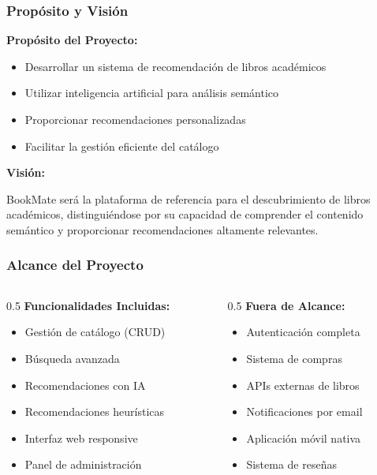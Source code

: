 \documentclass[aspectratio=169]{beamer}
\begin{document}
\begin{frame}
\frametitle{Propósito y Visión}

\textbf{Propósito del Proyecto:}
\begin{itemize}
\item Desarrollar un sistema de recomendación de libros académicos
\item Utilizar inteligencia artificial para análisis semántico
\item Proporcionar recomendaciones personalizadas
\item Facilitar la gestión eficiente del catálogo
\end{itemize}

\vspace{0.5cm}

\textbf{Visión:}
\begin{tcolorbox}[colback=green!5, colframe=green!50]
BookMate será la plataforma de referencia para el descubrimiento de libros académicos, distinguiéndose por su capacidad de comprender el contenido semántico y proporcionar recomendaciones altamente relevantes.
\end{tcolorbox}

\end{frame}

\begin{frame}
\frametitle{Alcance del Proyecto}

\begin{columns}
\begin{column}{0.5\textwidth}
\textbf{Funcionalidades Incluidas:}
\begin{itemize}
\item[\checkmark] Gestión de catálogo (CRUD)
\item[\checkmark] Búsqueda avanzada
\item[\checkmark] Recomendaciones con IA
\item[\checkmark] Recomendaciones heurísticas
\item[\checkmark] Interfaz web responsive
\item[\checkmark] Panel de administración
\end{itemize}
\end{column}

\begin{column}{0.5\textwidth}
\textbf{Fuera de Alcance:}
\begin{itemize}
\item[\ding{55}] Autenticación completa
\item[\ding{55}] Sistema de compras
\item[\ding{55}] APIs externas de libros
\item[\ding{55}] Notificaciones por email
\item[\ding{55}] Aplicación móvil nativa
\item[\ding{55}] Sistema de reseñas
\end{itemize}
\end{column}
\end{columns}

\end{frame}
\end{document}
